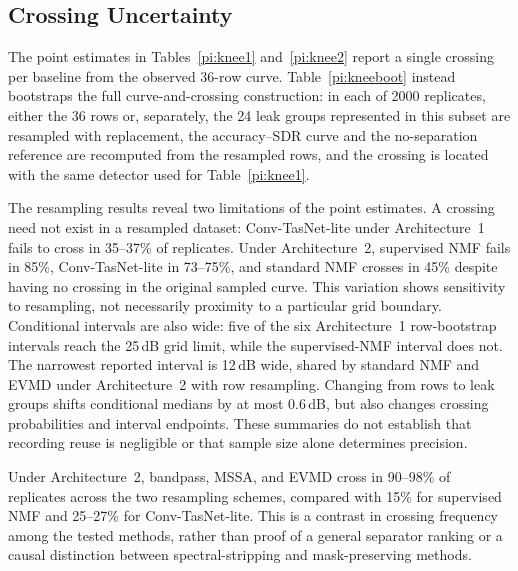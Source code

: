 \documentclass[journal]{IEEEtran}
\begin{document}
\subsection{Crossing Uncertainty}

The point estimates in Tables~\ref{pi:knee1} and~\ref{pi:knee2} report a single crossing per baseline from the observed 36-row curve. Table~\ref{pi:kneeboot} instead bootstraps the full curve-and-crossing construction: in each of 2000 replicates, either the 36 rows or, separately, the 24 leak groups represented in this subset are resampled with replacement, the accuracy--SDR curve and the no-separation reference are recomputed from the resampled rows, and the crossing is located with the same detector used for Table~\ref{pi:knee1}.

The resampling results reveal two limitations of the point estimates. A crossing need not exist in a resampled dataset: Conv-TasNet-lite under Architecture~1 fails to cross in 35--37\% of replicates. Under Architecture~2, supervised NMF fails in 85\%, Conv-TasNet-lite in 73--75\%, and standard NMF crosses in 45\% despite having no crossing in the original sampled curve. This variation shows sensitivity to resampling, not necessarily proximity to a particular grid boundary. Conditional intervals are also wide: five of the six Architecture~1 row-bootstrap intervals reach the 25\,dB grid limit, while the supervised-NMF interval does not. The narrowest reported interval is 12\,dB wide, shared by standard NMF and EVMD under Architecture~2 with row resampling. Changing from rows to leak groups shifts conditional medians by at most 0.6\,dB, but also changes crossing probabilities and interval endpoints. These summaries do not establish that recording reuse is negligible or that sample size alone determines precision.

Under Architecture~2, bandpass, MSSA, and EVMD cross in 90--98\% of replicates across the two resampling schemes, compared with 15\% for supervised NMF and 25--27\% for Conv-TasNet-lite. This is a contrast in crossing frequency among the tested methods, rather than proof of a general separator ranking or a causal distinction between spectral-stripping and mask-preserving methods.
\end{document}
